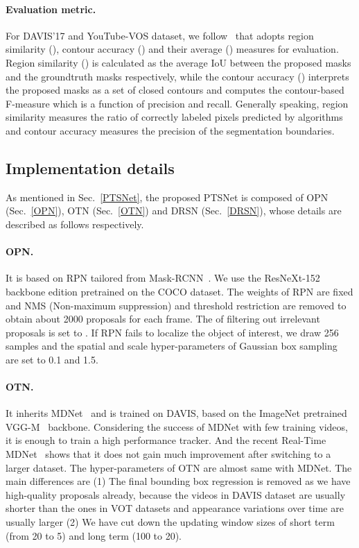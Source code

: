 \documentclass[10pt,twocolumn,letterpaper]{article}
\begin{document}
    \paragraph{Evaluation metric.}
    For DAVIS'17 and YouTube-VOS dataset, we follow~\cite{davis_eval_cvpr16} that adopts region similarity (), contour accuracy () and their average () measures for evaluation. Region similarity () is calculated as the average IoU between the proposed masks and the groundtruth masks respectively, while the contour accuracy () interprets the proposed masks as a set of closed contours and computes the contour-based F-measure which is a function of precision and recall. Generally speaking, region similarity measures the ratio of correctly labeled pixels predicted by algorithms and contour accuracy measures the precision of the segmentation boundaries.

\subsection{Implementation details}
As mentioned in Sec.~\ref{PTSNet}, the proposed PTSNet is composed of OPN (Sec.~\ref{OPN}), OTN (Sec.~\ref{OTN}) and DRSN (Sec.~\ref{DRSN}), whose details are described as follows respectively.

\paragraph{OPN.} It is based on RPN tailored from Mask-RCNN~\cite{mask_rcnn_iccv17}. We use the ResNeXt-152~\cite{Xie2016} backbone edition pretrained on the COCO dataset. The weights of RPN are fixed and NMS (Non-maximum suppression) and threshold restriction are removed to obtain about 2000 proposals for each frame. The  of filtering out irrelevant proposals is set to . If RPN fails to localize the object of interest, we draw 256 samples and the spatial and scale hyper-parameters of Gaussian box sampling~\cite{mdnet_cvpr16} are set to 0.1 and 1.5. 



\paragraph{OTN.} It inherits MDNet~\cite{mdnet_cvpr16} and is trained on DAVIS, based on the ImageNet pretrained VGG-M~\cite{chatfield14return} backbone. Considering the success of MDNet with few training videos, it is enough to train a high performance tracker. And the recent Real-Time MDNet~\cite{rt_mdnet_eccv18} shows that it does not gain much improvement after switching to a larger dataset. The hyper-parameters of OTN are almost same with MDNet. The main differences are (1) The final bounding box regression is removed as we have high-quality proposals already, because the videos in DAVIS dataset are usually shorter than the ones in VOT datasets and appearance variations over time are usually larger (2) We have cut down the updating window sizes of short term (from 20 to 5) and long term (100 to 20).
\end{document}
